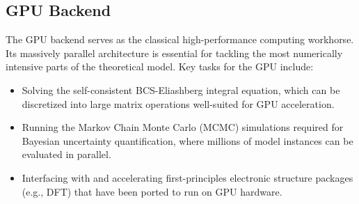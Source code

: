 \subsection{GPU Backend}
The GPU backend serves as the classical high-performance computing workhorse. Its massively parallel architecture is essential for tackling the most numerically intensive parts of the theoretical model. Key tasks for the GPU include:
\begin{itemize}
    \item Solving the self-consistent BCS-Eliashberg integral equation, which can be discretized into large matrix operations well-suited for GPU acceleration.
    \item Running the Markov Chain Monte Carlo (MCMC) simulations required for Bayesian uncertainty quantification, where millions of model instances can be evaluated in parallel.
    \item Interfacing with and accelerating first-principles electronic structure packages (e.g., DFT) that have been ported to run on GPU hardware.
\end{itemize}

